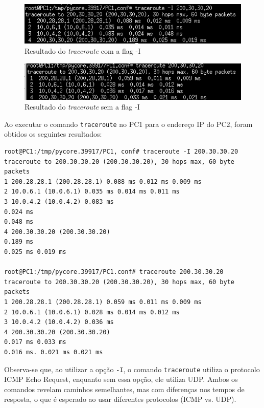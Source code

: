 \documentclass{article}
\begin{document}
\begin{figure}[h]
    \centering
    \includegraphics[width=1\linewidth]{images/traceroute-finI.png}
    \caption{Resultado do \textit{traceroute} com a flag -I}
    \label{fig:enter-label}
\end{figure}

\begin{figure}[h]
    \centering
    \includegraphics[width=1\linewidth]{images/traceroute-fin.png}
    \caption{Resultado do \textit{traceroute} sem a flag -I}
    \label{fig:enter-label}
\end{figure}

Ao executar o comando \texttt{traceroute} no PC1 para o endereço IP do PC2, foram obtidos os seguintes resultados:

\begin{verbatim}
root@PC1:/tmp/pycore.39917/PC1, conf# traceroute -I 200.30.30.20
traceroute to 200.30.30.20 (200.30.30.20), 30 hops max, 60 byte packets
1 200.28.28.1 (200.28.28.1) 0.088 ms 0.012 ms 0.009 ms
2 10.0.6.1 (10.0.6.1) 0.035 ms 0.014 ms 0.011 ms
3 10.0.4.2 (10.0.4.2) 0.083 ms
0.024 ms
0.048 ms
4 200.30.30.20 (200.30.30.20)
0.189 ms
0.025 ms 0.019 ms

root@PC1:/tmp/pycore.39917/PC1.conf# traceroute 200.30.30.20
traceroute to 200.30.30.20 (200.30.30.20), 30 hops max, 60 byte packets
1 200.28.28.1 (200.28.28.1) 0.059 ms 0.011 ms 0.009 ms
2 10.0.6.1 (10.0.6.1) 0.028 ms 0.014 ms 0.012 ms
3 10.0.4.2 (10.0.4.2) 0.036 ms
4 200.30.30.20 (200.30.30.20)
0.017 ms 0.033 ms
0.016 ms. 0.021 ms 0.021 ms
\end{verbatim}

Observa-se que, ao utilizar a opção \texttt{-I}, o comando \texttt{traceroute} utiliza o protocolo ICMP Echo Request, enquanto sem essa opção, ele utiliza UDP. Ambos os comandos revelam caminhos semelhantes, mas com diferenças nos tempos de resposta, o que é esperado ao usar diferentes protocolos (ICMP vs. UDP).
\end{document}
